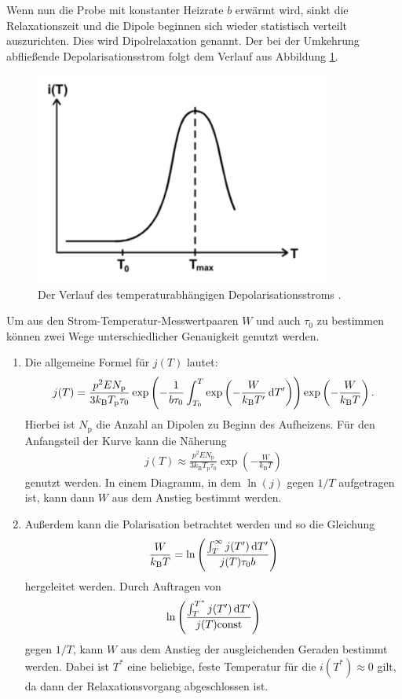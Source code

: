 Wenn nun die Probe mit konstanter Heizrate $b$ erwärmt wird, sinkt die Relaxationszeit und die Dipole beginnen sich wieder statistisch verteilt auszurichten. Dies wird Dipolrelaxation genannt. Der bei der Umkehrung abfließende Depolarisationsstrom folgt dem Verlauf aus Abbildung \ref{fig:stromTemp}.
\begin{figure}
  \centering
  \includegraphics[height= 7cm]{BestNippelpiercings/stromTemp.pdf}
  \caption{Der Verlauf des temperaturabhängigen Depolarisationsstroms \cite{anleitung}.}
  \label{fig:stromTemp}
\end{figure}
Um aus den Strom-Temperatur-Messwertpaaren $W$ und auch $\tau_0$ zu bestimmen können zwei Wege unterschiedlicher Genauigkeit genutzt werden.
\begin{enumerate}
  \item Die allgemeine Formel für $j(T)$ lautet:
    \begin{align}
      j(T) = \frac{p^2 E N_\text{p}}{3k_\text{B} T_\text{p}\tau_0}
      \exp\left(-\frac{1}{b\tau_0} \int_{T_0}^T\exp\left(-\frac{W}{k_\text{B}T'}\mathop{}\!\mathrm{d} T'\right)\right)
      \exp\left(-\frac{W}{k_\text{B}T}\right). \label{eqn:allgjt}
    \end{align}
    Hierbei ist $N_\text{p}$ die Anzahl an Dipolen zu Beginn des Aufheizens.
    Für den Anfangsteil der Kurve kann die Näherung
    \begin{align}
      j(T) \approx \frac{p^2 E N_\text{p}}{3k_\text{B} T_\text{p}\tau_0} \exp\left(-\frac{W}{k_\text{B}T}\right)
      \label{eqn:W1formel}
    \end{align}
    genutzt werden. In einem Diagramm, in dem $\ln(j)$ gegen $1/T$ aufgetragen ist, kann dann $W$ aus dem Anstieg bestimmt werden.
  \item Außerdem kann die Polarisation betrachtet werden und so die Gleichung
    \begin{align}
      \frac{W}{k_\text{B}T} = \ln\left(\frac{\int_{T}^{\infty} j(T')\mathop{}\!\mathrm{d} T'}{j(T)\tau_0 b}\right)
      \label{eqn:W2formel}
    \end{align}
    hergeleitet werden. Durch Auftragen von
    \begin{align*}
      \ln\left(\frac{\int_T^{T^*} j(T')\mathop{}\!\mathrm{d} T'}{j(T) \text{const}}\right)
    \end{align*}
    gegen $1/T$, kann $W$ aus dem Anstieg der ausgleichenden Geraden bestimmt werden. Dabei ist $T^*$ eine beliebige, feste Temperatur für die $i(T^*) \approx 0$ gilt, da dann der Relaxationsvorgang abgeschlossen ist.
\end{enumerate}
